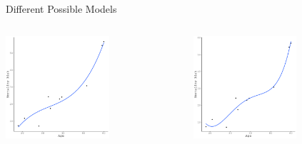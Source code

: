 \documentclass{beamer}\usepackage[]{graphicx}\usepackage[]{color}
\newenvironment{knitrout}{}{} %
\begin{document}
\begin{frame}{Different Possible Models}
\begin{columns}
\begin{column}{0.5\textwidth}
\begin{knitrout}
{}



\end{knitrout}

\end{column}
\end{columns}

  \va
  
\begin{columns}
  \begin{column}{0.5\textwidth}
    
\begin{knitrout}\footnotesize
{}\color{fgcolor}

{\centering \includegraphics[width=0.6\textwidth]{figure/unnamed-chunk-12-1} 

}



\end{knitrout}

\end{column}
  
\begin{column}{0.5\textwidth}
  
\begin{knitrout}\footnotesize
{}\color{fgcolor}

{\centering \includegraphics[width=0.6\textwidth]{figure/unnamed-chunk-13-1} 

}
\end{knitrout}
\end{column}
\end{columns}
\end{frame}
\end{document}
